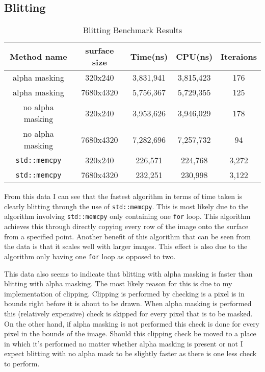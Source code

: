 \documentclass[
	letterpaper, %
	10pt, %
]{CSUniSchoolLabReport}
\begin{document}
\subsection{Blitting}
\begin{table}[ht]
	\caption{Blitting Benchmark Results} %
	\centering 
	\begin{tabular}{c c c c c} 
	\hline
	Method name & surface size & Time(ns) & CPU(ns) & Iteraions \\ [0.5ex] 
	\hline
	alpha masking & 320x240 & 3,831,941 & 3,815,423 & 176 \\ 
	alpha masking & 7680x4320 & 5,756,367 & 5,729,355 & 125 \\
	no alpha masking & 320x240 & 3,953,626 & 3,946,029 & 178 \\
	no alpha masking & 7680x4320 & 7,282,696 & 7,257,732 & 94 \\
	\verb|std::memcpy| & 320x240 & 226,571 & 224,768 & 3,272 \\ 
	\verb|std::memcpy| & 7680x4320 & 232,251 & 230,998 & 3,122 \\[1ex] 
	\end{tabular}
\end{table}
\begin{flushleft}
	From this data I can see that the fastest algorithm in terms of time taken is 
	clearly blitting through the use of \verb|std::memcpy|. This is most likely due
	to the algorithm involving \verb|std::memcpy| only containing one \verb|for| loop.
	This algorithm achieves this through directly copying every row of the image onto
	the surface from a specified point. Another benefit of this algorithm that can be seen from 
	the data is that it scales well with larger images. This effect is also due to the algorithm
	only having one \verb|for| loop as opposed to two.
\end{flushleft}
\begin{flushleft}
	This data also seems to indicate that blitting with alpha masking is faster than
	blitting with alpha masking. The most likely reason for this is due to my implementation 
	of clipping. Clipping is performed by checking is a pixel is in bounds right before it
	is about to be drawn. When alpha masking is performed this (relatively expensive) check 
	is skipped for every pixel that is to be masked. On the other hand, if alpha masking is not 
	performed this check is done for every pixel in the bounds of the image. Should this clipping 
	check be moved to a place in which it's performed no matter whether alpha masking is present or not
	I expect blitting with no alpha mask to be slightly faster as there is one less check to perform.
\end{flushleft}
\end{document}
